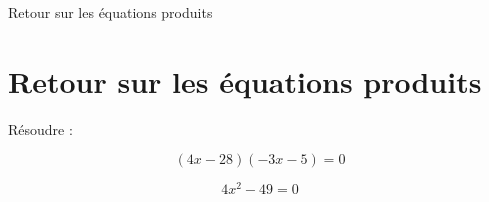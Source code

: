 \begin{frame}{Retour sur les équations produits}
    \section{Retour sur les équations produits}

    Résoudre :

    \begin{multicols}{2}
        \noindent$$(4x-28)(-3x-5)=0$$\vspace*{0.4\textheight}\columnbreak

        \noindent$$4x^2-49=0$$\vspace*{0.4\textheight}
    \end{multicols}
    \vfil
\end{frame}



        

